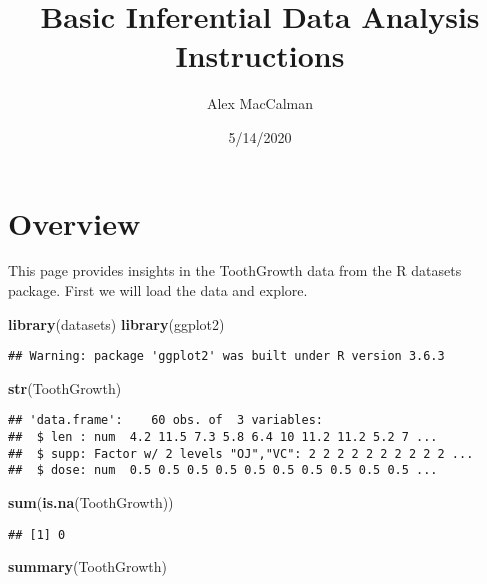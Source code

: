 \documentclass[
]{article}
\title{Basic Inferential Data Analysis Instructions}
\author{Alex MacCalman}
\date{5/14/2020}
\newenvironment{Shaded}{\begin{snugshade}}{\end{snugshade}}
\newcommand{\KeywordTok}[1]{\textcolor[rgb]{0.13,0.29,0.53}{\textbf{#1}}}
\newcommand{\NormalTok}[1]{#1}
\begin{document}
\maketitle

\hypertarget{overview}{%
\section{Overview}\label{overview}}

This page provides insights in the ToothGrowth data from the R datasets
package. First we will load the data and explore.

\begin{Shaded}
\begin{Highlighting}[]
\KeywordTok{library}\NormalTok{(datasets)}
\KeywordTok{library}\NormalTok{(ggplot2)}
\end{Highlighting}
\end{Shaded}

\begin{verbatim}
## Warning: package 'ggplot2' was built under R version 3.6.3
\end{verbatim}

\begin{Shaded}
\begin{Highlighting}[]
\KeywordTok{str}\NormalTok{(ToothGrowth)}
\end{Highlighting}
\end{Shaded}

\begin{verbatim}
## 'data.frame':    60 obs. of  3 variables:
##  $ len : num  4.2 11.5 7.3 5.8 6.4 10 11.2 11.2 5.2 7 ...
##  $ supp: Factor w/ 2 levels "OJ","VC": 2 2 2 2 2 2 2 2 2 2 ...
##  $ dose: num  0.5 0.5 0.5 0.5 0.5 0.5 0.5 0.5 0.5 0.5 ...
\end{verbatim}

\begin{Shaded}
\begin{Highlighting}[]
\KeywordTok{sum}\NormalTok{(}\KeywordTok{is.na}\NormalTok{(ToothGrowth))}
\end{Highlighting}
\end{Shaded}

\begin{verbatim}
## [1] 0
\end{verbatim}

\begin{Shaded}
\begin{Highlighting}[]
\KeywordTok{summary}\NormalTok{(ToothGrowth)}
\end{Highlighting}
\end{Shaded}
\end{document}
